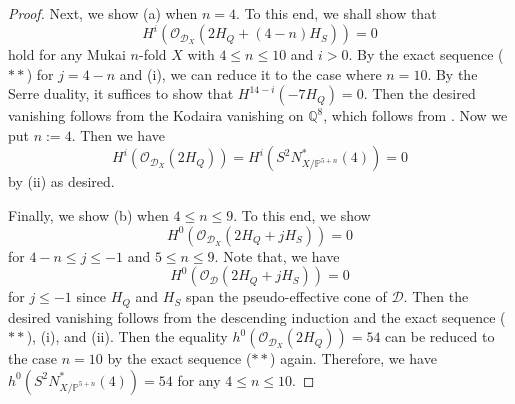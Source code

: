 \documentclass[autodetect-engine, a4paper]{amsart}
\theoremstyle{definition}
\def\P{{\mathbb P}}
\def\cO{\mathcal{O}}
\begin{document}
\begin{proof}
{Next, we show (a) when $n=4$.
To this end, we shall show that 
\begin{equation}
H^i (\cO_{\mathcal{D}_{X}} (2H_{Q} + (4-n) H_{S}) ) =0 
\tag{ii}
\end{equation}
hold for any Mukai $n$-fold $X$ with $4\leq n \leq 10$ and $i>0$.
By the exact sequence ($**$) for $j= 4-n$ and (i), we can reduce it to the case where $n=10$.
By the Serre duality, it suffices to show that
$H^{14-i} (-7H_{Q}) =0$.
Then the desired vanishing follows from the Kodaira vanishing on $\mathbb{Q}^8$, which follows from \cite[Proposition 2 and Theorem 2]{Mehta-Ramanathan}.
Now we put $n:=4$.
Then we have
\[
H^i (\cO_{\mathcal{D}_{X}} (2H_{Q})) = H^i (S^2 N^{\ast}_{X/\P^{5+n}} (4)) =0
\]
by (ii) as desired.

Finally, we show (b) when $4 \leq n \leq 9$.
To this end, we show
\[
H^0 (\cO_{\mathcal{D}_{X}} (2H_{Q}+ jH_{S})) =0
\]
for $4-n \leq j \leq -1$ and $5 \leq n \leq 9$.
Note that, we have
\[
H^0 (\cO_{\mathcal{D}} (2 H_{Q} + j H_{S})) =0
\]
for $j\leq -1$ since $H_{Q}$ and $H_{S}$ span the pseudo-effective cone of $\mathcal{D}$.
Then the desired vanishing follows from the descending induction and the exact sequence ($**$), (i), and (ii).
Then the equality $h^0 ( \cO_{\mathcal{D}_{X}} (2 H_{Q})) =54$ can be reduced to the case $n=10$ by the exact sequence ($**$) again.
Therefore, we have
$h^0 (S^2 N^{\ast}_{X/\P^{5+n}} (4)) =54$
for any $ 4 \leq n \leq 10$.
}
\end{proof}
\end{document}
